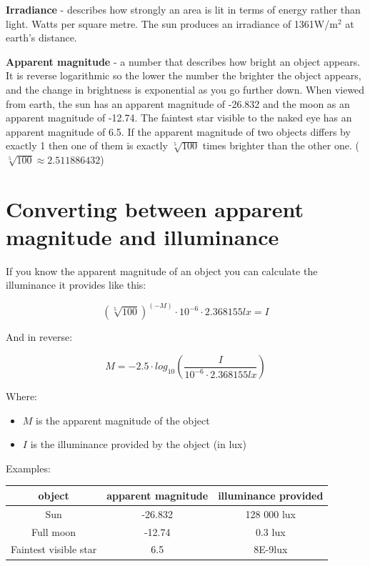 \documentclass[a4paper]{article}
\begin{document}
	\bigskip
	
	\textbf{Irradiance} - describes how strongly an area is lit in terms of energy rather than light. Watts per square metre. The sun produces an irradiance of 1361W/m$^2$ at earth's distance.
	
	\bigskip
	
	\textbf{Apparent magnitude} - a number that describes how bright an object appears. It is reverse logarithmic so the lower the number the brighter the object appears, and the change in brightness is exponential as you go further down. When viewed from earth, the sun has an apparent magnitude of -26.832 and the moon as an apparent magnitude of -12.74. The faintest star visible to the naked eye has an apparent magnitude of 6.5. If the apparent magnitude of two objects differs by exactly 1 then one of them is exactly $\sqrt[5]{100}$ times brighter than the other one. ($\sqrt[5]{100} \approx 2.511886432$)
    
	\pagebreak
	
	\section{Converting between apparent magnitude and illuminance}
	
	If you know the apparent magnitude of an object you can calculate the illuminance it provides like this:
	
	$$ (\sqrt[5]{100})^{(-M)} \cdot 10^{-6} \cdot 2.368155lx = I $$
	
	And in reverse:
	
	$$ M = -2.5 \cdot log_{10}\left( \frac{I}{10^{-6} \cdot 2.368155lx} \right) $$
	
	Where:
	
	\begin{itemize}
		\item $M$ is the apparent magnitude of the object
		
		\item $I$ is the illuminance provided by the object (in lux)
	\end{itemize}
	
	Examples:
	
	\begin{tabular}{| c | c | c |}
		\hline
		object & apparent magnitude & illuminance provided \\\hline
		Sun & -26.832 & 128 000 lux \\\hline
		Full moon & -12.74 & 0.3 lux \\\hline
		Faintest visible star & 6.5 & 8E-9lux \\\hline
	\end{tabular}
	
\end{document}
